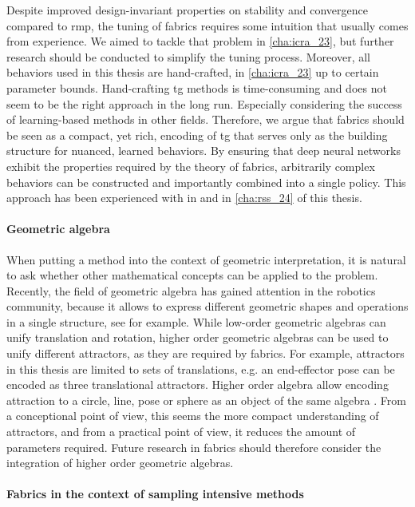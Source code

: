 Despite improved design-invariant properties on stability
and convergence compared to \ac{rmp}, the tuning of \ac{fabrics} requires some
intuition that usually comes from experience. We aimed to
tackle that problem in \cref{cha:icra_23}, but further
research should be conducted to simplify the tuning process.
Moreover, all behaviors used in this thesis are
hand-crafted, in \cref{cha:icra_23} up to certain
parameter bounds. Hand-crafting \ac{tg} methods is time-consuming
and does not seem to be the right approach in the long run.
Especially considering the success of learning-based methods
in other fields. Therefore, we argue that \ac{fabrics}
should be seen as a compact, yet rich, encoding of
\ac{tg} that serves only as the building structure for
nuanced, learned behaviors. By ensuring that deep neural
networks exhibit the properties required by the theory of 
\ac{fabrics}, arbitrarily complex behaviors can be
constructed and importantly combined into a single policy.
This approach has been experienced with in \cite{xie2023neural}
and in \cref{cha:rss_24} of this thesis.

\paragraph{Geometric algebra}
\label{par:discussion_geometric_algebra}

When putting a method into the context of geometric
interpretation, it is natural to ask whether other
mathematical concepts can be applied to the problem.
Recently, the field of geometric algebra has gained 
attention in the robotics community, because it allows
to express different geometric shapes and operations in a
single structure, see \cite{low2023geometric} for example.
While low-order geometric algebras can unify translation and
rotation, higher order geometric algebras can be used to unify
different attractors, as they are required by \ac{fabrics}.
For example, attractors in this thesis are limited to
sets of translations, e.g. an end-effector pose can be
encoded as three translational attractors. Higher order
algebra allow encoding attraction to a circle, line, pose
or sphere as an object of the same algebra \cite{low2023geometric}.
From a conceptional point of view, this seems the more
compact understanding of attractors, and from a practical
point of view, it reduces the amount of parameters required.
Future research in \ac{fabrics} should therefore consider
the integration of higher order geometric algebras.

\paragraph{Fabrics in the context of sampling intensive methods}
\label{par:discussion_sampling_methods}

